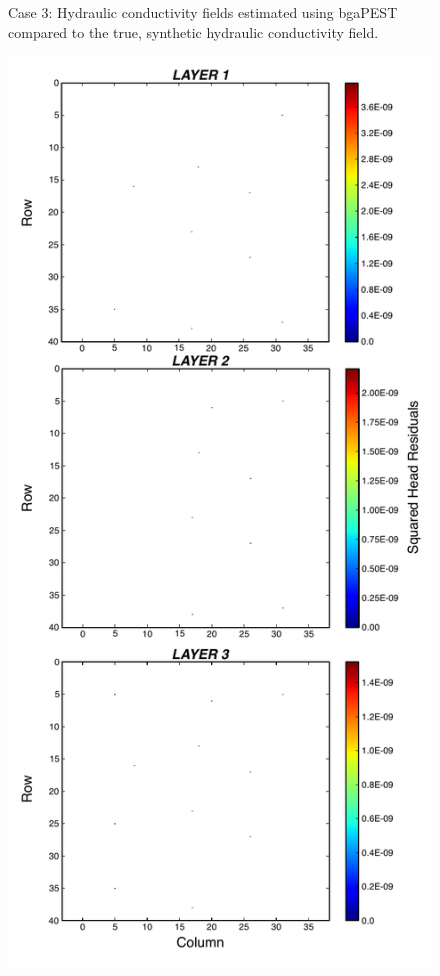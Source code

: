 \documentclass[11pt,oneside,onecolumn]{usgsreport}
\begin{document}
\begin{appendix}
\begin{figure}[!t]
\caption{\label{fig:3LK_case3}Case 3: Hydraulic conductivity fields estimated
using bgaPEST compared to the true, synthetic hydraulic conductivity
field.}
\end{figure}


\begin{figure}[!t]
\begin{center}\includegraphics[scale=0.5]{figures/3L_resid_case3}\end{center}


\end{figure}
\end{appendix}
\end{document}
